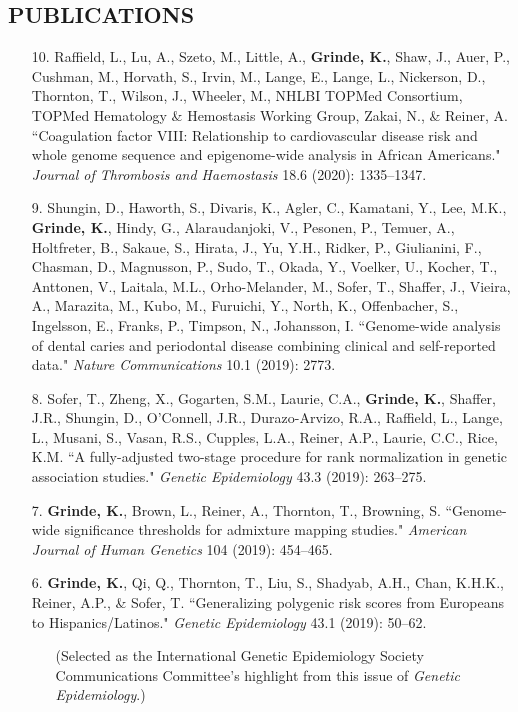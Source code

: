 \documentclass[margin]{res}
\begin{document}
\begin{resume}
										
\section{PUBLICATIONS} 

\begin{itemize}

\item[10.] Raffield, L., Lu, A., Szeto, M., Little, A., \textbf{Grinde, K.},  Shaw, J., Auer, P., Cushman, M., Horvath, S., Irvin, M., Lange, E., Lange, L., Nickerson, D., Thornton, T., Wilson, J., Wheeler, M., NHLBI TOPMed Consortium, TOPMed Hematology \& Hemostasis Working Group, Zakai, N., \& Reiner, A. ``Coagulation factor VIII: Relationship to cardiovascular disease risk and whole genome sequence and epigenome-wide analysis in African Americans." \textit{Journal of Thrombosis and Haemostasis} 18.6 (2020): 1335--1347.

\item[9.] Shungin, D., Haworth, S., Divaris, K., Agler, C., Kamatani, Y., Lee, M.K., \textbf{Grinde, K.}, Hindy, G., Alaraudanjoki, V., Pesonen, P., Temuer, A., Holtfreter, B., Sakaue, S., Hirata, J., Yu, Y.H., Ridker, P., Giulianini, F., Chasman, D., Magnusson, P., Sudo, T., Okada, Y., Voelker, U., Kocher, T., Anttonen, V., Laitala, M.L., Orho-Melander, M., Sofer, T., Shaffer, J., Vieira, A., Marazita, M., Kubo, M., Furuichi, Y., North, K., Offenbacher, S., Ingelsson, E., Franks, P., Timpson, N., Johansson, I. ``Genome-wide analysis of dental caries and periodontal disease combining clinical and self-reported data." \textit{Nature Communications} 10.1 (2019): 2773.

\item[8.] Sofer, T., Zheng, X., Gogarten, S.M., Laurie, C.A., \textbf{Grinde, K.}, Shaffer, J.R., Shungin, D., O'Connell, J.R., Durazo-Arvizo, R.A., Raffield, L., Lange, L., Musani, S., Vasan, R.S., Cupples, L.A., Reiner, A.P., Laurie, C.C., Rice, K.M. ``A fully-adjusted two-stage procedure for rank normalization in genetic association studies." \textit{Genetic Epidemiology} 43.3 (2019): 263--275.

\item[7.] \textbf{Grinde, K.}, Brown, L., Reiner, A., Thornton, T., Browning, S. ``Genome-wide significance thresholds for admixture mapping studies." \textit{American Journal of Human Genetics} 104 (2019): 454--465. 

\item[6.] \textbf{Grinde, K.}, Qi, Q., Thornton, T., Liu, S., Shadyab, A.H., Chan, K.H.K., Reiner, A.P., \& Sofer, T. ``Generalizing polygenic risk scores from Europeans to Hispanics/Latinos." \textit{Genetic Epidemiology} 43.1 (2019): 50--62. 
	\begin{itemize} \itemsep -2pt
	\item[] (Selected as the International Genetic Epidemiology Society Communications Committee's highlight from this issue of \textit{Genetic Epidemiology}.)
	\end{itemize}
 

\end{itemize}
\end{resume}
\end{document}
